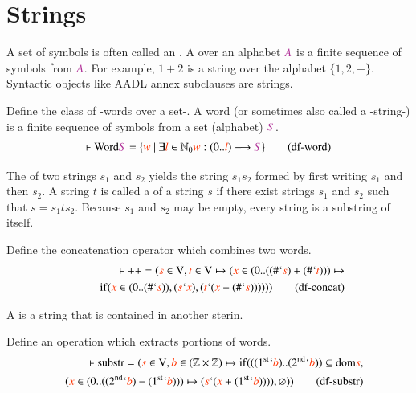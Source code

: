 \section{Strings}\label{sec:strings}

\pn A set of symbols is often called an .  A  over an alphabet $\mc{A}$
is a finite sequence of symbols from $\mc{A}$.  For example, $1+2$ is a string over the alphabet
$\{1,2,+\}$.  Syntactic objects like AADL annex subclauses are strings.
\begin{metadefinition} {Define the class of -words over a set-.} 
A word (or sometimes also
       called a -string-) is a finite sequence of symbols from a set
(alphabet)
       $\mc{S}$.  
\begin{align}
\vdash \mathrm{Word } \mc{S} = \{ \msc{w} ~\vert~ \exists \msc{l} \in
    \mathbb{N}_0 \msc{w} : ( 0 .. \msc{l} ) \longrightarrow \mc{S}
    \}\label{eq:df-word}\tag{df-word}
\end{align}
\end{metadefinition}

\pn The  of two strings $s_1$ and $s_2$ yields the string $s_{1}s_{2}$ 
formed by first writing $s_1$ and then $s_2$.  
A string $t$ is called a  of a string $s$ if there exist strings $s_1$ and $s_2$
such that $s=s_{1}t s_{2}$.  Because $s_1$ and $s_2$ may be empty, every string is a substring of itself.
\begin{metadefinition} {Define the concatenation operator}
which combines two words.  
\begin{align}
\vdash \mathrm{ ++ } = ( \msc{s} \in {\rm V} , \msc{t} \in {\rm V} \mapsto (
    \msc{x} \in ( 0 .. ( ( \# ` \msc{s} ) + ( \# ` \msc{t} ) ) ) \mapsto\notag
    \\~~~~~~~~~~ {\rm
    if} ( \msc{x} \in ( 0 .. ( \# ` \msc{s} ) ) , ( \msc{s} ` \msc{x} ) , (
    \msc{t} ` ( \msc{x} - ( \# ` \msc{s} ) ) ) ) )
    )\label{eq:df-concat}\tag{df-concat}
\end{align}
\end{metadefinition}

\pn A  is a string that is contained in another sterin.
\begin{metadefinition} {Define an operation which extracts
portions of words.} 
\begin{align}
\vdash \mathrm{ substr } = ( \msc{s} \in {\rm V} , \msc{b} \in ( \mathbb{Z}
    \times \mathbb{Z} ) \mapsto {\rm if} ( ( ( 1^{\rm st} ` \msc{b} ) .. (
    2^{\rm nd} ` \msc{b} ) ) \subseteq {\rm dom} \msc{s} , \notag
    \\ ~~~~( \msc{x} \in ( 0
    .. ( ( 2^{\rm nd} ` \msc{b} ) - ( 1^{\rm st} ` \msc{b} ) ) ) \mapsto (
    \msc{s} ` ( \msc{x} + ( 1^{\rm st} ` \msc{b} ) ) ) ) , \varnothing )
    )\label{eq:df-substr}\tag{df-substr}
\end{align}
\end{metadefinition}



